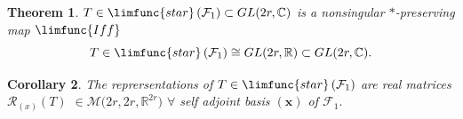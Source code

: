 \documentclass[aps,preprint]{revtex4}
\newtheorem{theorem}{Theorem}
\newtheorem{corollary}[theorem]{Corollary}
\begin{document}
\begin{theorem}
$T\in \limfunc{star}\left( \mathcal{F}_{1}\right) \subset GL(2r,\mathbb{C)}$
is a nonsingular $\ast $-preserving map $\limfunc{Iff}$ 
\begin{equation}
T\in \limfunc{star}\left( \mathcal{F}_{1}\right) \cong GL(2r,\mathbb{R)}%
\subset GL(2r,\mathbb{C)}.
\end{equation}
\end{theorem}

\begin{corollary}
The reprersentations of $T\in \limfunc{star}\left( \mathcal{F}_{1}\right) $
are real matrices $\mathcal{R}_{\left( x\right) }\left( T\right) $ $\in 
\mathcal{M}(2r,2r,\mathbb{R}^{2r}\mathbb{)}$ $\forall $ self adjoint basis $%
\left( \boldsymbol{x}\right) $ of $\mathcal{F}_{1}.$
\end{corollary}
\end{document}
